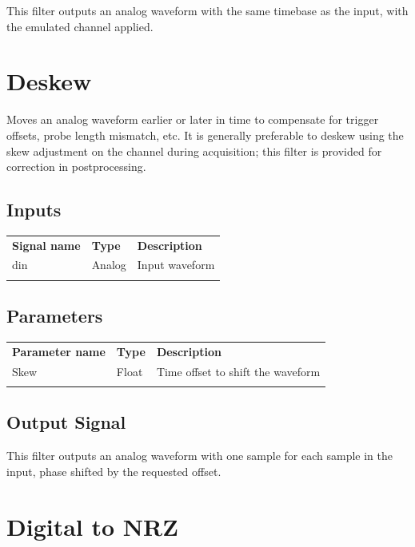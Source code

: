 This filter outputs an analog waveform with the same timebase as the input, with the emulated channel applied.

\pagebreak
\section{Deskew}
\label{filter:deskew}

Moves an analog waveform earlier or later in time to compensate for trigger offsets, probe length mismatch, etc.
It is generally preferable to deskew using the skew adjustment on the channel during acquisition; this filter is
provided for correction in postprocessing.

\subsection{Inputs}

\begin{tabularx}{16cm}{llX}
\thickhline
\textbf{Signal name} & \textbf{Type} & \textbf{Description} \\
\thickhline
din & Analog & Input waveform \\
\thickhline
\end{tabularx}

\subsection{Parameters}

\begin{tabularx}{16cm}{llX}
\thickhline
\textbf{Parameter name} & \textbf{Type} & \textbf{Description} \\
\thickhline
Skew & Float & Time offset to shift the waveform\\
\thickhline
\end{tabularx}

\subsection{Output Signal}

This filter outputs an analog waveform with one sample for each sample in the input, phase shifted by the requested
offset.

\pagebreak
\section{Digital to NRZ}
\label{filter:digitaltonrz}

